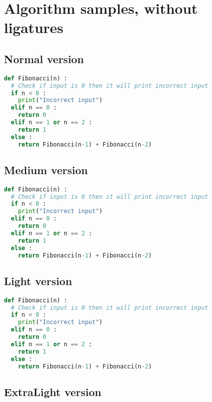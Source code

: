 \documentclass{article}
\begin{document}
\section{Algorithm samples, without ligatures}

\subsection{Normal version}

\begin{lstlisting}[language=python,basicstyle=\footnotesize\jetbrainsmono,commentstyle=\itshape\color{gray},keywordstyle=\bfseries\color{magenta},tabsize=4,frame=single]
def Fibonacci(n) :
  # Check if input is 0 then it will print incorrect input
  if n < 0 :
    print("Incorrect input")
  elif n == 0 :
    return 0
  elif n == 1 or n == 2 :
    return 1
  else :
    return Fibonacci(n-1) + Fibonacci(n-2)
\end{lstlisting}

\subsection{Medium version}

\begin{lstlisting}[language=python,basicstyle=\footnotesize\jetbrainsmonomedium,commentstyle=\itshape\color{gray},keywordstyle=\bfseries\color{magenta},tabsize=4,frame=single]
def Fibonacci(n) :
  # Check if input is 0 then it will print incorrect input
  if n < 0 :
    print("Incorrect input")
  elif n == 0 :
    return 0
  elif n == 1 or n == 2 :
    return 1
  else :
    return Fibonacci(n-1) + Fibonacci(n-2)
\end{lstlisting}

\subsection{Light version}

\begin{lstlisting}[language=python,basicstyle=\footnotesize\jetbrainsmonolight,commentstyle=\itshape\color{gray},keywordstyle=\bfseries\color{magenta},tabsize=4,frame=single]
def Fibonacci(n) :
  # Check if input is 0 then it will print incorrect input
  if n < 0 :
    print("Incorrect input")
  elif n == 0 :
    return 0
  elif n == 1 or n == 2 :
    return 1
  else :
    return Fibonacci(n-1) + Fibonacci(n-2)
\end{lstlisting}

\subsection{ExtraLight version}
\end{document}

